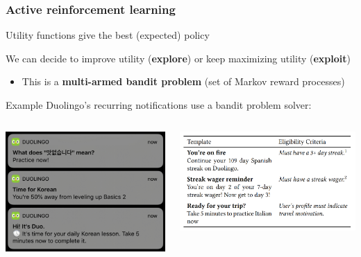 \documentclass{beamer}
\begin{document}
\begin{frame}
	\frametitle{Active reinforcement learning}
	Utility functions give the best (expected) policy
	
	We can decide to improve utility (\textbf{explore}) or keep maximizing utility (\textbf{exploit})
	\begin{itemize}
		\item This is a \textbf{multi-armed bandit problem} (set of Markov reward processes)
	\end{itemize}
	\pause
	\begin{block}{Example}
		Duolingo's recurring notifications use a bandit problem solver:
		\begin{columns}
		\begin{column}{0.4\textwidth}
			\begin{center}
				\includegraphics[scale=0.24]{figures/duolingo_notifications.png}
			\end{center}
		\end{column}
		\begin{column}{0.6\textwidth} %
			\begin{center}
				\includegraphics[scale=0.25]{figures/duolingo_eligibility.png}
			\end{center}
		\end{column}
		\end{columns}
	\end{block}
\end{frame}
\end{document}
